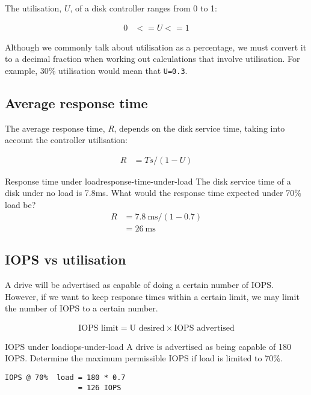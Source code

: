 \documentclass[slides]{pgnotes}
\begin{document}
The utilisation, $U$, of a disk controller ranges from 0 to 1:

\begin{align}
  0 & <= U <= 1 \label{eq:utilisation-range}
\end{align}

Although we commonly talk about utilisation as a percentage, we must
convert it to a decimal fraction when working out calculations that
involve utilisation. For example, 30\% utilisation would mean that
\texttt{U=0.3}.

\subsection{Average response time}
\label{sec:average-response-time}

The average response time, {\emph{R}}, depends on the disk service time,
taking into account the controller utilisation:

\begin{align}
R & = Ts / ( 1 - U ) \label{eq:response-time}
\end{align}

\begin{example}{Response time under load}{response-time-under-load}
  The disk service time of a disk under no load is 7.8ms.
  What would the response time expected under 70\% load be?
  \tcblower
\begin{align}
R & = \SI{7.8}{\milli\second} / ( 1 - 0.7 ) \\
  & = \SI{26}{\milli\second}
\end{align}
\end{example}

\subsection{IOPS vs utilisation}
\label{sec:iops-vs-utilisation}

A drive will be advertised as capable of doing a certain number of IOPS.
However, if we want to keep response times within a certain limit, we
may limit the number of IOPS to a certain number.

\begin{align}
  \mbox{IOPS limit} = \mbox{U desired} \times \mbox{IOPS advertised} \label{eq:iops-under-load}
\end{align}

\begin{example}{IOPS under load}{iops-under-load}
  A drive is advertised as being capable of 180 IOPS.
  Determine the maximum permissible IOPS if load is limited to 70\%.
\tcblower
\begin{verbatim}
IOPS @ 70%  load = 180 * 0.7
                 = 126 IOPS
\end{verbatim}
\end{example}
\end{document}
